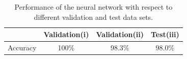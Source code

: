 \documentclass{article}
\begin{document}
\begin{table}[H]
    \centering
    \begin{tabular}{c|c|c|c}
        \toprule
             & Validation(i)  & Validation(ii) & Test(iii)   \\
        \midrule
        Accuracy     & 100\% & 98.3\% &  98.0\%  \\
        \bottomrule
    \end{tabular}
    \caption{Performance of the neural network with respect to different validation and test data sets.}
    \label{tab:Performance}
\end{table}
\end{document}
